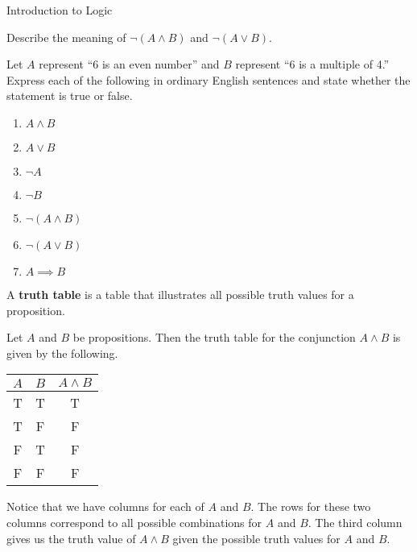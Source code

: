 \begin{section}{Introduction to Logic}
\begin{skeleton}
\begin{center}
\end{center}
\end{skeleton}

\begin{exercise}
Describe the meaning of $\neg (A \wedge B)$ and $\neg (A \vee B)$.
\end{exercise}

\begin{exercise}\label{exer:translations}
Let $A$ represent ``6 is an even number'' and $B$ represent ``6 is a multiple of 4.''  Express each of the following in ordinary English sentences and state whether the statement is true or false.
\begin{enumerate}[label=\textrm{(\alph*)}]
  \item $A \wedge B$
  \item $A \vee B$
  \item $\neg A$
  \item $\neg B$
  \item $\neg (A \wedge B)$
  \item $\neg (A \vee B)$
  \item $A \implies B$
\end{enumerate}
\end{exercise}

\begin{definition}
A \textbf{truth table} is a table that illustrates all possible truth values for a proposition.  
\end{definition}

\begin{example}
Let $A$ and $B$ be propositions.  Then the truth table for the conjunction $A\wedge B$ is given by the following.
\begin{center}
\begin{tabular}{@{}ccc@{}}
\toprule
$A$  &  $B$ & $A \wedge B$  \\
\midrule
T & T & T  \\ 
T & F & F  \\ 
F & T & F  \\ 
F & F & F  \\
\bottomrule
\end{tabular}
\end{center}
Notice that we have columns for each of $A$ and $B$.  The rows for these two columns correspond to all possible combinations for $A$ and $B$.  The third column gives us the truth value of $A\wedge B$ given the possible truth values for $A$ and $B$.
\end{example}


\end{section}
